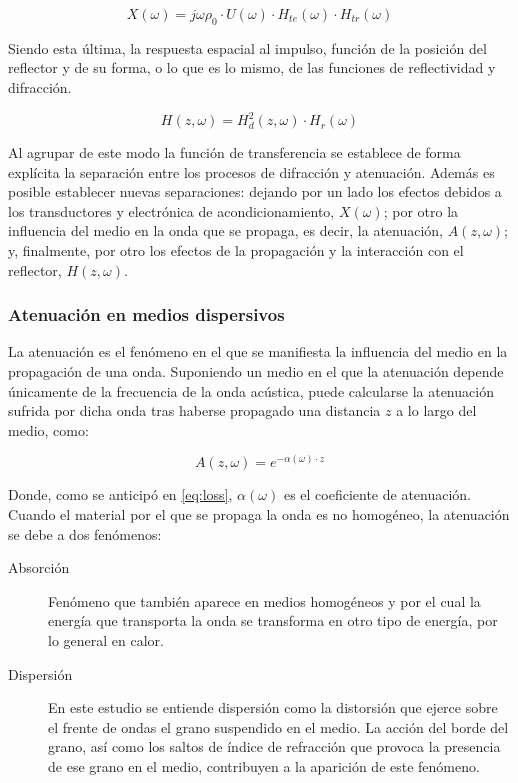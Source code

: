 \begin{equation}
	X(\omega) = j\omega\rho_0\cdot U(\omega)\cdot H_{te}(\omega)\cdot H_{tr}(\omega)
	\label{eq:transducer}
\end{equation}

Siendo esta última, la respuesta espacial al impulso, función de la posición del reflector y de su forma, o lo que es lo mismo, de las funciones de reflectividad y difracción.

\begin{equation}
	H(z, \omega) = H^2_d(z, \omega)\cdot H_r(\omega)
	\label{eq:spacialresponse}
\end{equation}

Al agrupar de este modo la función de transferencia se establece de forma explícita la separación entre los procesos de difracción y atenuación. Además es posible establecer nuevas separaciones: dejando por un lado los efectos debidos a los transductores y electrónica de acondicionamiento, $X(\omega)$; por otro la influencia del medio en la onda que se propaga, es decir, la atenuación, $A(z, \omega)$; y, finalmente, por otro los efectos de la propagación y la interacción con el reflector, $H(z, \omega)$.


\subsubsection{Atenuación en medios dispersivos}

La atenuación es el fenómeno en el que se manifiesta la influencia del medio en la propagación de una onda. Suponiendo un medio en el que la atenuación depende únicamente de la frecuencia de la onda acústica, puede calcularse la atenuación sufrida por dicha onda tras haberse propagado una distancia $z$ a lo largo del medio, como:

\begin{equation}
	A(z, \omega) = e^{-\alpha(\omega)\cdot z}
	\label{eq:independentloss}
\end{equation}

Donde, como se anticipó en \eqref{eq:loss}, $\alpha(\omega)$ es el coeficiente de atenuación. Cuando el material por el que se propaga la onda es no homogéneo, la atenuación se debe a dos fenómenos:

\begin{description}
	\item[Absorción] Fenómeno que también aparece en medios homogéneos y por el cual la energía que transporta la onda se transforma en otro tipo de energía, por lo general en calor.
	\item[Dispersión] En este estudio se entiende dispersión como la distorsión que ejerce sobre el frente de ondas el grano suspendido en el medio. La acción del borde del grano, así como los saltos de índice de refracción que provoca la presencia de ese grano en el medio, contribuyen a la aparición de este fenómeno.
\end{description}

